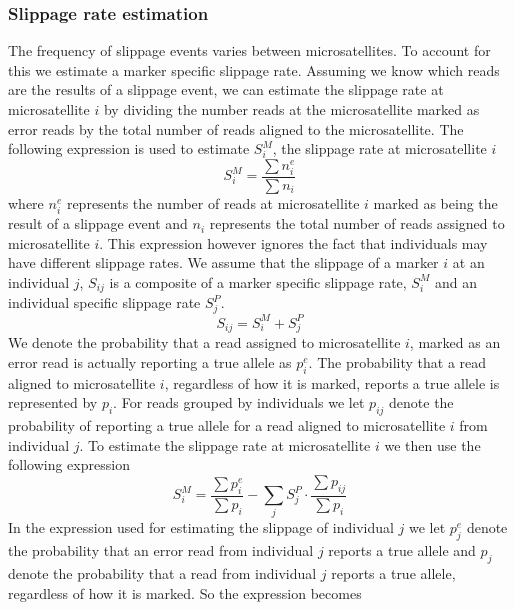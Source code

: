 \documentclass{bioinfo}
\begin{document}
\begin{methods}
\subsubsection{Slippage rate estimation}
The frequency of slippage events varies between microsatellites. To account for this we estimate a marker specific slippage rate.   Assuming we know which reads are the results of a slippage 
event, we can estimate the slippage rate at microsatellite $i$ by dividing the number reads at the microsatellite marked as error reads by the total number of reads aligned to the microsatellite.
The following expression is used to estimate $S^M_i$, the slippage rate at microsatellite $i$
\begin{equation}
    S^{M}_i = \frac{\sum n^e_i}{\sum n_i}
\label{eq:SmInit}
\end{equation}
where $n^e_i$ represents the number of reads at microsatellite $i$ marked as being the result of a slippage event and $n_i$ represents the total number of reads assigned to microsatellite $i$.
This expression however ignores the fact that individuals may have different slippage rates.
We assume that the slippage of a marker $i$ at an individual $j$, $S_{ij}$ is a composite of a marker specific slippage rate, $S^M_i$ and an individual specific slippage rate $S^P_j$.
\begin{equation}
    S_{ij} = S^{M}_i+S^{P}_j 
\end{equation}
We denote the probability that a read assigned to microsatellite $i$, marked as an error read is actually reporting a true allele as $p^e_i$. 
The probability that a read aligned to microsatellite $i$, regardless of how it is marked, reports a true allele is represented by $p_i$. For reads grouped by individuals we let $p_{ij}$ denote the probability of reporting a true allele for a read aligned to microsatellite $i$ from individual $j$. To estimate the slippage rate at microsatellite $i$ we then use the following expression
\begin{equation}
S^{M}_i = \frac{\sum p^e_i}{\sum p_i} - 
\sum_j S^{P}_j \cdot \frac{\sum p_{ij}}{\sum p_i}
\label{eq:sMjEq}
\end{equation}
In the expression used for estimating the slippage of individual $j$ we let $p^e_j$ denote the probability that an error read from individual $j$ reports a true allele and $p_j$ denote the probability that a read from individual $j$ reports a true allele, regardless of how it is marked. So the expression becomes

\end{methods}
\end{document}
